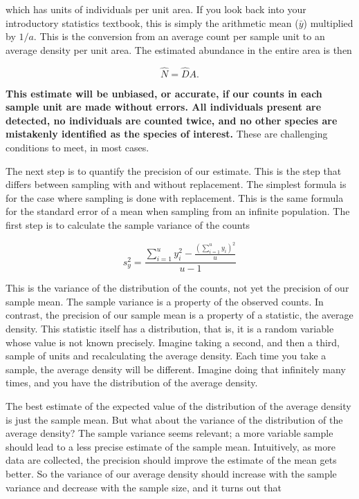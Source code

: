 \documentclass[]{book}
\theoremstyle{definition}
\theoremstyle{definition}
\theoremstyle{definition}
\theoremstyle{remark}
\begin{document}
which has units of individuals per unit area. If you look back into your
introductory statistics textbook, this is simply the arithmetic mean
(\(\bar{y}\)) multiplied by \(1/a\). This is the conversion from an
average count per sample unit to an average density per unit area. The
estimated abundance in the entire area is then

\begin{equation}
  \hat{N}=\hat{D}A.
  \label{eq:abundance}
\end{equation}

\textbf{This estimate will be unbiased, or accurate, if our counts in
each sample unit are made without errors. All individuals present are
detected, no individuals are counted twice, and no other species are
mistakenly identified as the species of interest.} These are challenging
conditions to meet, in most cases.

The next step is to quantify the precision of our estimate. This is the
step that differs between sampling with and without replacement. The
simplest formula is for the case where sampling is done with
replacement. This is the same formula for the standard error of a mean
when sampling from an infinite population. The first step is to
calculate the sample variance of the counts

\[
s_y^2 = \frac{\sum_{i=1}^{u}{y_i^2}-\frac{\left(\sum_{i=1}^u{y_i}\right)^2}{u}}
               {u-1}
  \label{eq:samplevariance}
\]

This is the variance of the distribution of the counts, not yet the
precision of our sample mean. The sample variance is a property of the
observed counts. In contrast, the precision of our sample mean is a
property of a statistic, the average density. This statistic itself has
a distribution, that is, it is a random variable whose value is not
known precisely. Imagine taking a second, and then a third, sample of
units and recalculating the average density. Each time you take a
sample, the average density will be different. Imagine doing that
infinitely many times, and you have the distribution of the average
density.

The best estimate of the expected value of the distribution of the
average density is just the sample mean. But what about the variance of
the distribution of the average density? The sample variance seems
relevant; a more variable sample should lead to a less precise estimate
of the sample mean. Intuitively, as more data are collected, the
precision should improve the estimate of the mean gets better. So the
variance of our average density should increase with the sample variance
and decrease with the sample size, and it turns out that
\end{document}
